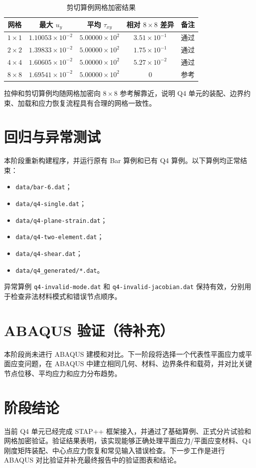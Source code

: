 ﻿\documentclass[UTF8,11pt,a4paper]{ctexart}
\begin{document}
\begin{table}[h]
\centering
\caption{剪切算例网格加密结果}
\begin{tabular}{ccccc}
\toprule
网格 & 最大 $u_y$ & 平均 $\tau_{xy}$ & 相对 $8\times8$ 差异 & 备注 \\
\midrule
$1\times1$ & $1.10053\times10^{-2}$ & $5.00000\times10^2$ & $3.51\times10^{-1}$ & 通过 \\
$2\times2$ & $1.39833\times10^{-2}$ & $5.00000\times10^2$ & $1.75\times10^{-1}$ & 通过 \\
$4\times4$ & $1.60605\times10^{-2}$ & $5.00000\times10^2$ & $5.27\times10^{-2}$ & 通过 \\
$8\times8$ & $1.69541\times10^{-2}$ & $5.00000\times10^2$ & $0$ & 参考 \\
\bottomrule
\end{tabular}
\end{table}

拉伸和剪切算例均随网格加密向 $8\times8$ 参考解靠近，说明 Q4 单元的装配、边界约束、加载和应力恢复流程具有合理的网格一致性。

\section{回归与异常测试}
本阶段重新构建程序，并运行原有 Bar 算例和已有 Q4 算例。以下算例均正常结束：
\begin{itemize}
  \item \texttt{data/bar-6.dat}；
  \item \texttt{data/q4-single.dat}；
  \item \texttt{data/q4-plane-strain.dat}；
  \item \texttt{data/q4-two-element.dat}；
  \item \texttt{data/q4-shear.dat}；
  \item \texttt{data/q4\_generated/*.dat}。
\end{itemize}
异常算例 \texttt{q4-invalid-mode.dat} 和 \texttt{q4-invalid-jacobian.dat} 保持有效，分别用于检查非法材料模式和错误节点顺序。

\section{ABAQUS 验证（待补充）}
本阶段尚未进行 ABAQUS 建模和对比。下一阶段将选择一个代表性平面应力或平面应变问题，在 ABAQUS 中建立相同几何、材料、边界条件和载荷，并对比关键节点位移、平均应力和应力分布趋势。

\section{阶段结论}
当前 Q4 单元已经完成 STAP++ 框架接入，并通过了基础算例、正式分片试验和网格加密验证。验证结果表明，该实现能够正确处理平面应力/平面应变材料、Q4 刚度矩阵装配、中心点应力恢复和常见输入错误检查。下一步工作是进行 ABAQUS 对比验证并补充最终报告中的验证图表和结论。
\end{document}
